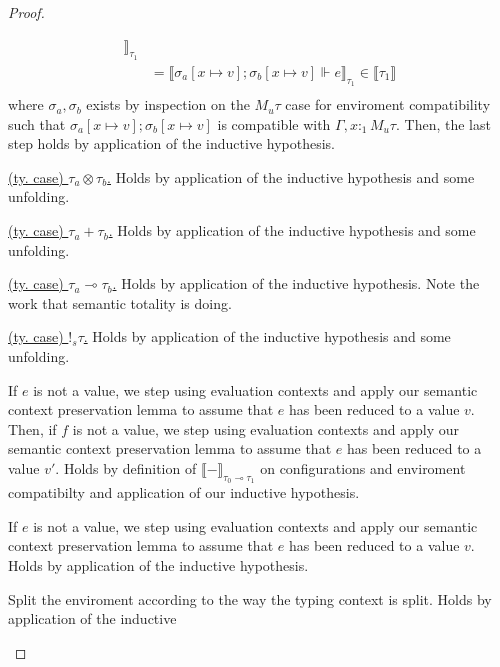 \begin{proof}
\begin{description}
\begin{description}
\begin{equation*}
\begin{aligned}
            \rrbracket_{\tau_1} \\
            & =
            \llbracket \sigma_a[x \mapsto v]; \sigma_b[x \mapsto v] \Vdash e
            \rrbracket_{\tau_1} \in \llbracket \tau_1 \rrbracket \\
          \end{aligned}
        \end{equation*}
        where $\sigma_a, \sigma_b$ exists by inspection on the $M_u \tau$ case
        for enviroment compatibility such that $\sigma_a[x \mapsto v];
        \sigma_b[x \mapsto v]$ is compatible with $\Gamma, x :_1 M_u \tau$.
        Then, the last step holds by application of the inductive hypothesis.
      \item{\underline{(ty. case) $\tau_a \otimes \tau_b$.}} Holds by
        application of the inductive hypothesis and some unfolding.
      \item{\underline{(ty. case) $\tau_a + \tau_b$.}} Holds by application of
        the inductive hypothesis and some unfolding.
      \item{\underline{(ty. case) $\tau_a \multimap \tau_b$.}} Holds by
        application of the inductive hypothesis. Note the work that semantic
        totality is doing.
      \item{\underline{(ty. case) $!_s \tau$.}} Holds by application of the
        inductive hypothesis and some unfolding.
    \end{description}
  \item[\textsc{(ty. rule) $\multimap E$.}] 
    If $e$ is not a value, we step using evaluation contexts and apply our
    semantic context preservation lemma to assume that $e$ has been reduced to a
    value $v$.
    Then, if $f$ is not a value, we step using evaluation contexts and apply our
    semantic context preservation lemma to assume that $e$ has been reduced to a
    value $v'$.
    Holds by definition of $\llbracket -
    \rrbracket_{\tau_0 \multimap \tau_1}$ on configurations and enviroment
    compatibilty and application of our inductive hypothesis.
  \item[\textsc{(ty. rule) $! I$.}] 
    If $e$ is not a value, we step using evaluation contexts and apply our
    semantic context preservation lemma to assume that $e$ has been reduced to a
    value $v$.
    Holds by application of the inductive hypothesis.
  \item[\textsc{(ty. rule) $! E$.}] Split the enviroment according to the way
    the typing context is split. Holds by application of the inductive

\end{description}
\end{proof}
